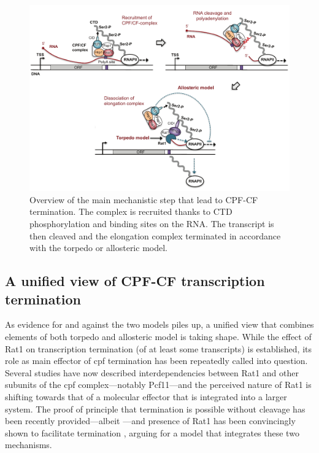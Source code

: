 \begin{figure}[ht]

\centering
\includegraphics[width=\textwidth]{figures/introduction/cpf}
\caption[Mechanism of CPF-CF termination]{Overview of the main mechanistic step that lead to CPF-CF termination. The complex is recruited thanks to CTD phosphorylation and binding sites on the RNA. The transcript is then cleaved and the elongation complex terminated in accordance with the torpedo or allosteric model.}
\label{fig:cpfTermination}

\end{figure}

\subsection{A unified view of CPF-CF transcription termination}

As evidence for and against the two models piles up, a unified view that combines elements of both torpedo and allosteric model is taking shape.
While the effect of Rat1 on transcription termination (of at least some transcripts) is established, its role as main effector of \gls{cpf} termination has been repeatedly called into question.
Several studies have now described interdependencies between Rat1 and other subunits of the \gls{cpf} complex---notably Pcf11---and the perceived nature of Rat1 is shifting towards that of a molecular effector  that is integrated into a larger system.
The proof of principle that termination is possible without cleavage has been recently provided---albeit \invitro{} \cite{zhang:2015:polya}---and presence of Rat1 has been convincingly shown to facilitate termination \cite{fong:2015:effects}, arguing for a model that integrates these two mechanisms.

